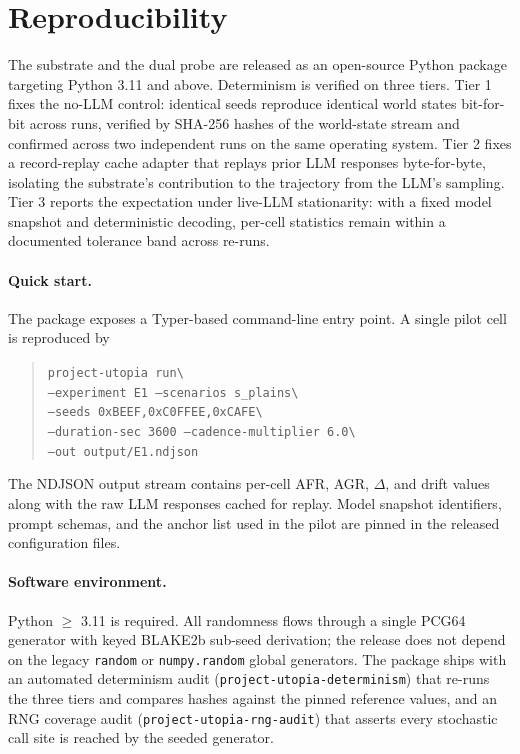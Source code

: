\section{Reproducibility}
\label{app:reproducibility}

The substrate and the dual probe are released as an open-source
Python package targeting Python 3.11 and above. Determinism is
verified on three tiers. Tier 1 fixes the no-LLM control: identical
seeds reproduce identical world states bit-for-bit across runs,
verified by SHA-256 hashes of the world-state stream and confirmed
across two independent runs on the same operating system. Tier 2
fixes a record-replay cache adapter that replays prior LLM
responses byte-for-byte, isolating the substrate's contribution to
the trajectory from the LLM's sampling. Tier 3 reports the
expectation under live-LLM stationarity: with a fixed model
snapshot and deterministic decoding, per-cell statistics remain
within a documented tolerance band across re-runs.

\paragraph{Quick start.}
The package exposes a Typer-based command-line entry point. A
single pilot cell is reproduced by

\begin{quote}\small
\texttt{project-utopia run\textbackslash}\\
\texttt{\quad --experiment E1 --scenarios s\_plains\textbackslash}\\
\texttt{\quad --seeds 0xBEEF,0xC0FFEE,0xCAFE\textbackslash}\\
\texttt{\quad --duration-sec 3600 --cadence-multiplier 6.0\textbackslash}\\
\texttt{\quad --out output/E1.ndjson}
\end{quote}

\noindent
The NDJSON output stream contains per-cell AFR, AGR, $\Delta$, and
drift values along with the raw LLM responses cached for replay.
Model snapshot identifiers, prompt schemas, and the anchor list
used in the pilot are pinned in the released configuration files.

\paragraph{Software environment.}
Python $\geq$ 3.11 is required. All randomness flows through a
single PCG64 generator with keyed BLAKE2b sub-seed derivation; the
release does not depend on the legacy \texttt{random} or
\texttt{numpy.random} global generators. The package ships with an
automated determinism audit (\texttt{project-utopia-determinism})
that re-runs the three tiers and compares hashes against the
pinned reference values, and an RNG coverage audit
(\texttt{project-utopia-rng-audit}) that asserts every stochastic
call site is reached by the seeded generator.
